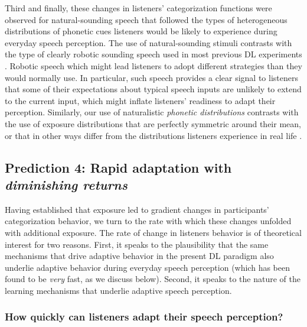 \documentclass[
  11pt,
  man,mask,floatsintext]{apa6}
\begin{document}
Third and finally, these changes in listeners' categorization functions were observed for natural-sounding speech that followed the types of heterogeneous distributions of phonetic cues listeners would be likely to experience during everyday speech perception. The use of natural-sounding stimuli contrasts with the type of clearly robotic sounding speech used in most previous DL experiments \autocites[for notable exceptions, see][]{chladkova2017,theodore-monto2019}. Robotic speech which might lead listeners to adopt different strategies than they would normally use. In particular, such speech provides a clear signal to listeners that some of their expectations about typical speech inputs are unlikely to extend to the current input, which might inflate listeners' readiness to adapt their perception. Similarly, our use of naturalistic \emph{phonetic distributions} contrasts with the use of exposure distributions that are perfectly symmetric around their mean, or that in other ways differ from the distributions listeners experience in real life \autocite[for a notable exception,][]{chladkova2017}.

\subsection{\texorpdfstring{Prediction 4: Rapid adaptation with \emph{diminishing returns}}{Prediction 4: Rapid adaptation with diminishing returns}}\label{prediction-4-rapid-adaptation-with-diminishing-returns}

Having established that exposure led to gradient changes in participants' categorization behavior, we turn to the rate with which these changes unfolded with additional exposure. The rate of change in listeners behavior is of theoretical interest for two reasons. First, it speaks to the plausibility that the same mechanisms that drive adaptive behavior in the present DL paradigm also underlie adaptive behavior during everyday speech perception (which has been found to be \emph{very} fast, as we discuss below). Second, it speaks to the nature of the learning mechanisms that underlie adaptive speech perception.

\subsubsection{How quickly can listeners adapt their speech perception?}\label{how-quickly-can-listeners-adapt-their-speech-perception}
\end{document}
